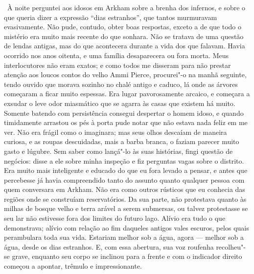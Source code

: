 ~À noite perguntei aos idosos em Arkham sobre a brenha dos infernos, e
sobre o que queria dizer a expressão ``dias estranhos'', que tantos
murmuravam evasivamente. Não pude, contudo, obter boas respostas, exceto
a de que todo o mistério era muito mais recente do que sonhara. Não se
tratava de uma questão de lendas antigas, mas do que acontecera durante
a vida dos que falavam. Havia ocorrido nos anos oitenta, e uma família
desaparecera ou fora morta. Meus interlocutores não eram exatos; e como
todos me disseram para não prestar atenção aos loucos contos do velho
Ammi Pierce, procurei"-o na manhã seguinte, tendo ouvido que morava
sozinho no chalé antigo e caduco, lá onde as árvores começaram a ficar
muito espessas. Era lugar pavorosamente arcaico, e começara a exsudar o
leve odor miasmático que se agarra às casas que existem há muito.
Somente batendo com persistência consegui despertar o homem idoso, e
quando timidamente arrastou os pés à porta pude notar que não estava
nada feliz em me ver. Não era frágil como o imaginara; mas seus olhos
descaíam de maneira curiosa, e as roupas descuidadas, mais a barba
branca, o faziam parecer muito gasto e lúgubre. Sem saber como lançá"-lo
às suas histórias, fingi questão de negócios: disse a ele sobre minha
inspeção e fiz perguntas vagas sobre o distrito. Era muito mais
inteligente e educado do que eu fora levado a pensar, e antes que
percebesse já havia compreendido tanto do assunto quanto qualquer pessoa
com quem conversara em Arkham. Não era como outros rústicos que eu
conhecia das regiões onde se construíam reservatórios. Da sua parte, não
protestava quanto às milhas de bosque velho e terra arável a serem
submersas, ou talvez protestasse se seu lar não estivesse fora dos
limites do futuro lago. Alívio era tudo o que demonstrava; alívio com
relação ao fim daqueles antigos vales escuros, pelos quais perambulara
toda sua vida. Estariam melhor sob a água, agora --- melhor sob a água,
desde os dias estranhos. E, com essa abertura, sua voz roufenha
recolheu"-se grave, enquanto seu corpo se inclinou para a frente e com o
indicador direito começou a apontar, trêmulo e impressionante.

